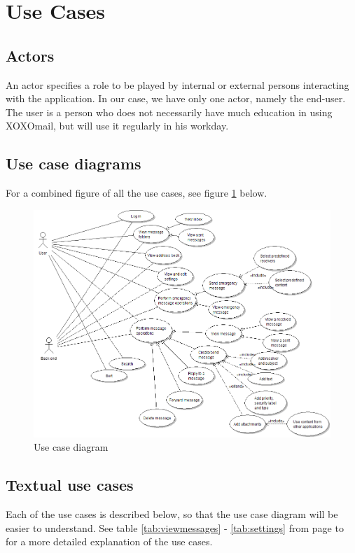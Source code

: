 \section{Use Cases}

\subsection{Actors}
An actor specifies a role to be played by internal or external persons interacting with the application. In our case, we have only one actor, namely the end-user. The user is a person who does not necessarily have much education in using XOXOmail, but will use it regularly in his workday. 

\subsection{Use case diagrams}
For a combined figure of all the use cases, see figure \ref{fig:usecase} below.

\begin{figure}[h!]
\begin{center}
\includegraphics[width=\textwidth]{kpro-use-case}
\caption{Use case diagram} \label{fig:usecase}
\end{center}
\end{figure}

\subsection{Textual use cases}
Each of the use cases is described below, so that the use case diagram will be easier to understand. See table \ref{tab:viewmessages} - \ref{tab:settings} from page \pageref{tab:viewmessages} to \pageref{tab:settings} for a more detailed explanation of the use cases.

